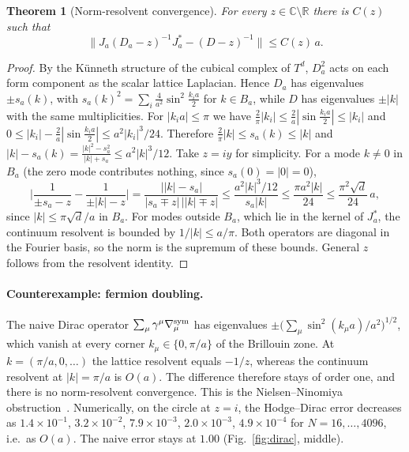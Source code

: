 \documentclass[11pt]{article}
\newtheorem{theorem}{Theorem}
\theoremstyle{remark}\newtheorem*{remark}{Remark}
\newcommand{\RR}{\mathbb{R}}
\begin{document}
\begin{theorem}[Norm-resolvent convergence]
\label{thm:resolvent}
For every $z\in\mathbb C\setminus\RR$ there is $C(z)$ such that
\begin{equation}
\big\|J_a(D_a-z)^{-1}J_a^*-(D-z)^{-1}\big\|\le C(z)\,a .
\end{equation}
\end{theorem}
\begin{proof}
By the K\"unneth structure of the cubical complex of $T^d$, $D_a^2$ acts on each form component as the scalar lattice
Laplacian. Hence $D_a$ has eigenvalues $\pm s_a(k)$, with
$s_a(k)^2=\sum_i\frac{4}{a^2}\sin^2\frac{k_ia}{2}$ for $k\in B_a$, while $D$ has eigenvalues $\pm|k|$ with the same
multiplicities. For $|k_ia|\le\pi$ we have $\frac2\pi|k_i|\le\frac2a|\sin\frac{k_ia}2|\le|k_i|$ and
$0\le|k_i|-\frac2a|\sin\frac{k_ia}2|\le a^2|k_i|^3/24$. Therefore $\frac2\pi|k|\le s_a(k)\le|k|$ and
$|k|-s_a(k)=\frac{|k|^2-s_a^2}{|k|+s_a}\le a^2|k|^3/12$. Take $z=iy$ for simplicity. For a mode $k\neq0$ in $B_a$ (the zero mode contributes nothing, since
$s_a(0)=|0|=0$),
\begin{equation}
\Big|\frac{1}{\pm s_a-z}-\frac{1}{\pm|k|-z}\Big|=\frac{\big||k|-s_a\big|}{|s_a\mp z|\,\big||k|\mp z\big|}\le\frac{a^2|k|^3/12}{s_a|k|}
\le\frac{\pi a^2|k|}{24}\le\frac{\pi^2\sqrt d}{24}\,a ,
\end{equation}
since $|k|\le\pi\sqrt d/a$ in $B_a$. For modes outside $B_a$, which lie in the kernel of $J_a^*$, the continuum resolvent
is bounded by $1/|k|\le a/\pi$. Both operators are diagonal in the Fourier basis, so the norm is the supremum
of these bounds. General $z$ follows from the resolvent identity.
\end{proof}

\paragraph{Counterexample: fermion doubling.} The naive Dirac operator $\sum_\mu\gamma^\mu\nabla^{\rm sym}_\mu$ has
eigenvalues $\pm\big(\sum_\mu\sin^2(k_\mu a)/a^2\big)^{1/2}$, which vanish at every corner $k_\mu\in\{0,\pi/a\}$ of the
Brillouin zone. At $k=(\pi/a,0,\dots)$ the lattice resolvent equals $-1/z$, whereas the continuum resolvent at
$|k|=\pi/a$ is $O(a)$. The difference therefore stays of order one, and there is no norm-resolvent convergence.
This is the Nielsen--Ninomiya obstruction~\cite{NielsenNinomiya}. Numerically, on the circle at $z=i$, the
Hodge--Dirac error decreases as $1.4\times10^{-1}$, $3.2\times10^{-2}$, $7.9\times10^{-3}$, $2.0\times10^{-3}$,
$4.9\times10^{-4}$ for $N=16,\dots,4096$, i.e.\ as $O(a)$. The naive error stays at $1.00$ (Fig.~\ref{fig:dirac}, middle).
\end{document}
